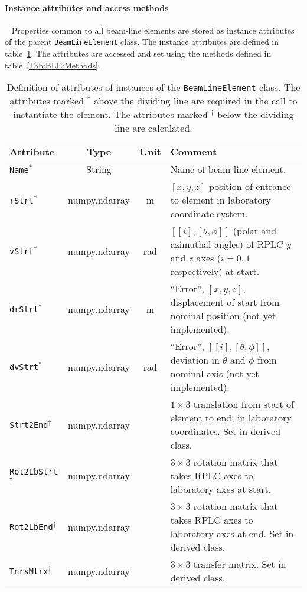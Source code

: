 \paragraph{Instance attributes and access methods} ~\newline
\label{SubSubSect:BLE:InstAttr}
\noindent
Properties common to all beam-line elements are stored as instance
attributes of the parent \texttt{BeamLineElement} class.
The instance attributes are defined in table~\ref{Tab:BLE:Attributes}.
The attributes are accessed and set using the methods defined in
table~\ref{Tab:BLE:Methods}.
\begin{table}[h]
  \caption{
    Definition of attributes of instances of
    the \texttt{BeamLineElement} class.
    The attributes marked $^*$ above the dividing line are required in
    the call to instantiate the element.
    The attributes marked $^\dagger$ below the dividing line are
    calculated.
  }
  \label{Tab:BLE:Attributes}
  \begin{center}
    \begin{tabular}{|l|c|c|p{9.7cm}|}
      \hline
      \textbf{Attribute} & \textbf{Type} & \textbf{Unit} & \textbf{Comment}                                                                   \\
      \hline
      \texttt{Name}$^*$     & String        &     & Name of beam-line element.                                                                \\
      \texttt{rStrt}$^*$    & numpy.ndarray & m   & $[x, y, z]$ position of entrance to element in laboratory coordinate system.              \\
      \texttt{vStrt}$^*$    & numpy.ndarray & rad & $[[i],[\theta, \phi]]$ (polar and azimuthal angles) of RPLC $y$ and $z$ axes ($i=0,1$ respectively) at start. \\
      \texttt{drStrt}$^*$   & numpy.ndarray & m   & ``Error'', $[x, y, z]$, displacement of start from nominal position (not yet implemented).\\
      \texttt{dvStrt}$^*$   & numpy.ndarray & rad & ``Error'', $[[i],[\theta, \phi]]$, deviation in $\theta$ and $\phi$ from nominal axis (not yet implemented). \\
      \hline
      \texttt{Strt2End}$^\dagger$     & numpy.ndarray &     & $1\times3$ translation from start of element to end; in laboratory coordinates.  Set in derived class. \\
      \texttt{Rot2LbStrt}$^\dagger$   & numpy.ndarray &     & $3\times3$ rotation matrix that takes RPLC axes to laboratory axes at start.     \\
      \texttt{Rot2LbEnd}$^\dagger$    & numpy.ndarray &     & $3\times3$ rotation matrix that takes RPLC axes to laboratory axes at end.  Set in derived class.      \\
      \texttt{TnrsMtrx}$^\dagger$     & numpy.ndarray &     & $3\times3$ transfer matrix.  Set in derived class.                               \\
      \hline
    \end{tabular}
  \end{center}
\end{table}
